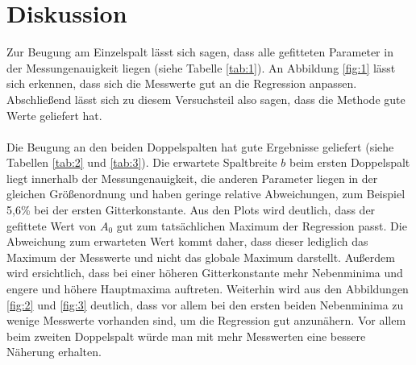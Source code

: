 \section{Diskussion}
Zur Beugung am Einzelspalt lässt sich sagen, dass alle gefitteten Parameter in der
Messungenauigkeit liegen (siehe Tabelle \ref{tab:1}). An Abbildung \ref{fig:1} lässt sich erkennen, dass sich die Messwerte
gut an die Regression anpassen. Abschließend lässt sich zu diesem Versuchsteil also sagen, dass
die Methode gute Werte geliefert hat. \\
\\
Die Beugung an den beiden Doppelspalten hat gute Ergebnisse geliefert (siehe Tabellen \ref{tab:2} und \ref{tab:3}).
Die erwartete Spaltbreite $b$ beim ersten Doppelspalt liegt innerhalb der Messungenauigkeit,
die anderen Parameter liegen in der gleichen Größenordnung und haben geringe relative Abweichungen,
zum Beispiel 5,6\% bei der ersten Gitterkonstante. Aus den Plots wird deutlich, dass der gefittete Wert von $A_0$
gut zum tatsächlichen Maximum der Regression passt. Die Abweichung zum erwarteten Wert kommt daher,
dass dieser lediglich das Maximum der Messwerte und nicht das globale Maximum darstellt. Außerdem
wird ersichtlich, dass bei einer höheren Gitterkonstante mehr Nebenminima und engere und höhere Hauptmaxima
auftreten. Weiterhin wird aus den Abbildungen \ref{fig:2} und \ref{fig:3}
deutlich, dass vor allem bei den ersten beiden Nebenminima zu wenige Messwerte vorhanden sind,
um die Regression gut anzunähern. Vor allem beim zweiten Doppelspalt würde man mit mehr Messwerten
eine bessere Näherung erhalten.
\newpage
\nocite{*}
\printbibliography
